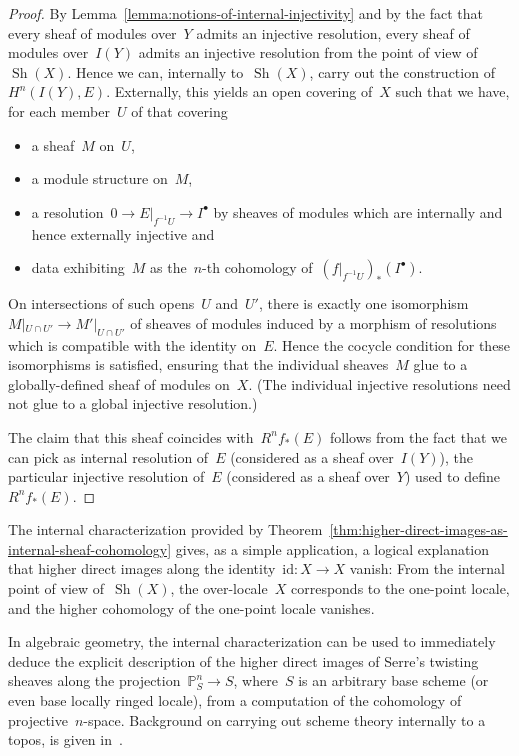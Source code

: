 \documentclass[oneside]{amsart}
\theoremstyle{definition}
\theoremstyle{plain}
\theoremstyle{remark}
\DeclareMathOperator{\Sh}{Sh}
\renewcommand{\_}{\mathpunct{.}\,}
\begin{document}
\begin{proof}By Lemma~\ref{lemma:notions-of-internal-injectivity} and by the
fact that every sheaf of modules over~$Y$ admits an injective resolution, every sheaf
of modules over~$I(Y)$ admits an injective resolution from the point of view
of~$\Sh(X)$. Hence we can, internally to~$\Sh(X)$, carry out the construction of~$H^n(I(Y), E)$.
Externally, this yields an open covering of~$X$ such that we have, for each
member~$U$ of that covering
\begin{itemize}
\item a sheaf~$M$ on~$U$,
\item a module structure on~$M$,
\item a resolution~$0 \to E|_{f^{-1}U} \to I^\bullet$ by sheaves of modules which are
internally and hence externally injective and
\item data exhibiting~$M$ as the~$n$-th cohomology
of~$(f|_{f^{-1}U})_*(I^\bullet)$.
\end{itemize}
On intersections of such opens~$U$ and~$U'$, there is exactly one
isomorphism~$M|_{U \cap U'} \to M'|_{U \cap U'}$ of sheaves of modules induced by
a morphism of resolutions which is compatible with the identity on~$E$.
Hence the cocycle condition for these isomorphisms is satisfied, ensuring that
the individual sheaves~$M$ glue to a globally-defined sheaf of modules on~$X$.
(The individual injective resolutions need not glue to a global injective
resolution.)

The claim that this sheaf coincides with~$R^n f_*(E)$ follows from the fact
that we can pick as internal resolution of~$E$ (considered as a sheaf
over~$I(Y)$), the particular injective resolution of~$E$ (considered as a sheaf
over~$Y$) used to define~$R^n f_*(E)$.
\end{proof}

The internal characterization provided by
Theorem~\ref{thm:higher-direct-images-as-internal-sheaf-cohomology} gives, as a
simple application, a logical explanation that higher direct images along
the identity~$\mathrm{id} : X \to X$ vanish: From the internal point of view
of~$\Sh(X)$, the over-locale~$X$ corresponds to the one-point locale, and the
higher cohomology of the one-point locale vanishes.

In algebraic geometry, the internal characterization can be used to immediately
deduce the explicit description of the higher direct images of Serre's twisting
sheaves along the projection~$\mathbb{P}^n_S \to S$, where~$S$ is an arbitrary
base scheme (or even base locally ringed locale), from a computation of the
cohomology of projective~$n$-space. Background on carrying out scheme
theory internally to a topos, is given in~\cite[Section~12]{blechschmidt:phd}.
\end{document}
